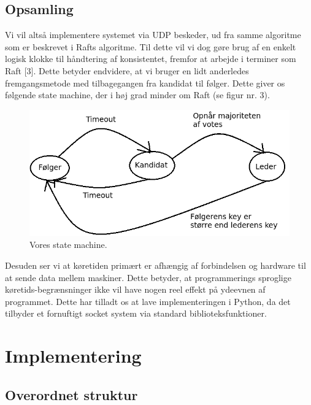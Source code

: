 \documentclass[a4paper,12pt]{article}
\begin{document}
\subsection{Opsamling}
Vi vil altså implementere systemet via UDP beskeder, ud fra samme algoritme som er beskrevet i Rafts algoritme. Til dette vil vi dog gøre brug af en enkelt logisk klokke til håndtering af konsistentet, fremfor at arbejde i terminer som Raft [3]. Dette betyder endvidere, at vi bruger en lidt anderledes fremgangsmetode med tilbagegangen fra kandidat til følger. Dette giver os følgende state machine, der i høj grad minder om Raft (se figur nr. 3). \\
\begin{figure}[H]
  \caption{Vores state machine.}
  \centering
    \includegraphics[width=1\textwidth]{State-machine.png}
\end{figure}
Desuden ser vi at køretiden primært er afhængig af forbindelsen og hardware til at sende data mellem maskiner. Dette betyder, at programmerings sproglige køretids-begrænsninger ikke vil have nogen reel effekt på ydeevnen af programmet. Dette har tilladt os at lave implementeringen i Python, da det tilbyder et fornuftigt socket system via standard biblioteksfunktioner.
\newpage

\section{Implementering} 
\subsection{Overordnet struktur} 
\end{document}
